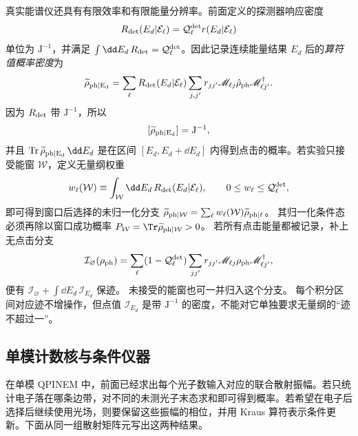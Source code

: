 真实能谱仪还具有有限效率和有限能量分辨率。前面定义的探测器响应密度
\[
R_{\rm det}(E_d|\mathcal E_\ell)
=\mathcal Q_\ell^{\rm det} r(E_d|\mathcal E_\ell)
\]
单位为 $\mathrm{J^{-1}}$，并满足 $\int\dd E_d\,R_{\rm det}=\mathcal Q_\ell^{\rm det}$。因此记录连续能量结果 $E_d$ 后的\emph{算符值概率密度}为
\begin{equation}
{
\widetilde\rho_{\rm ph|E_d}
=\sum_\ell R_{\rm det}(E_d|\mathcal E_\ell)
\sum_{j,j'}r_{jj'}
\mathscr M_{\ell j}\hat\rho_{\rm ph}
\mathscr M_{\ell j'}^\dagger.}
\label{eq:conditional_photon_detector_coarse_graining}
\end{equation}
因为 $R_{\rm det}$ 带 $\mathrm{J^{-1}}$，所以
\[
[\widetilde\rho_{\rm ph|E_d}]=\mathrm{J^{-1}},
\]
并且 $\operatorname{Tr}\widetilde\rho_{\rm ph|E_d}\,\dd E_d$ 是在区间 $[E_d,E_d+\dd E_d]$ 内得到点击的概率。若实验只接受能窗 $\mathcal W$，定义无量纲权重
\[
w_\ell(\mathcal W)
\equiv\int_{\mathcal W}\dd E_d\,
R_{\rm det}(E_d|\mathcal E_\ell),
\qquad 0\le w_\ell\le\mathcal Q_\ell^{\rm det},
\]
即可得到窗口后选择的未归一化分支
$\widetilde\rho_{{\rm ph}|\mathcal W}=\sum_\ell w_\ell(\mathcal W)\widetilde\rho_{{\rm ph}|\ell}$。
其归一化条件态必须再除以窗口成功概率 $P_{\mathcal W}=\Tr\widetilde\rho_{{\rm ph}|\mathcal W}>0$。
若所有点击能量都被记录，补上无点击分支
\[
 \mathcal I_{\varnothing}(\rho_{\rm ph})
 =\sum_\ell(1-\mathcal Q_\ell^{\rm det})
 \sum_{jj'}r_{jj'}\mathscr M_{\ell j}\rho_{\rm ph}\mathscr M_{\ell j'}^\dagger,
\]
便有 $\mathcal I_{\varnothing}+\int\dd E_d\,\mathcal I_{E_d}$ 保迹。
未接受的能窗也可一并归入这个分支。
每个积分区间对应迹不增操作，但点值 $\mathcal I_{E_d}$ 是带 $\mathrm{J^{-1}}$ 的密度，不能对它单独要求无量纲的“迹不超过一”。

\subsection{单模计数核与条件仪器}\label{subsec:single-mode-number-instrument-dp19}

在单模 QPINEM 中，前面已经求出每个光子数输入对应的联合散射振幅。若只统计电子落在哪条边带，对不同的未测光子末态求和即可得到概率。若希望在电子后选择后继续使用光场，则要保留这些振幅的相位，并用 Kraus 算符表示条件更新。下面从同一组散射矩阵元写出这两种结果。


